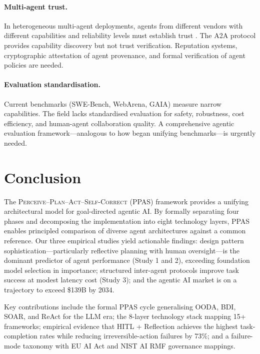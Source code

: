 \documentclass[review,authoryear]{elsarticle}
\theoremstyle{definition}
\begin{document}
\paragraph{Multi-agent trust.} In heterogeneous multi-agent deployments, agents from different vendors with different capabilities and reliability levels must establish trust \citep{dorri2018multiagent}. The A2A protocol \citep{google2024a2a} provides capability discovery but not trust verification. Reputation systems, cryptographic attestation of agent provenance, and formal verification of agent policies are needed.

\paragraph{Evaluation standardisation.} Current benchmarks (SWE-Bench, WebArena, GAIA) measure narrow capabilities. The field lacks standardised evaluation for safety, robustness, cost efficiency, and human-agent collaboration quality. A comprehensive agentic evaluation framework---analogous to how \citet{liu2024agentbench} began unifying benchmarks---is urgently needed.

\section{Conclusion}\label{sec:conclusion}

The \textsc{Perceive--Plan--Act--Self-Correct} (PPAS) framework provides a unifying architectural model for goal-directed agentic AI. By formally separating four phases and decomposing the implementation into eight technology layers, PPAS enables principled comparison of diverse agent architectures against a common reference. Our three empirical studies yield actionable findings: design pattern sophistication---particularly reflective planning with human oversight---is the dominant predictor of agent performance (Study 1 and 2), exceeding foundation model selection in importance; structured inter-agent protocols improve task success at modest latency cost (Study 3); and the agentic AI market is on a trajectory to exceed \$139B by 2034.

Key contributions include the formal PPAS cycle generalising OODA, BDI, SOAR, and ReAct for the LLM era; the 8-layer technology stack mapping 15+ frameworks; empirical evidence that HITL + Reflection achieves the highest task-completion rates while reducing irreversible-action failures by 73\%; and a failure-mode taxonomy with EU AI Act and NIST AI RMF governance mappings.
\end{document}
